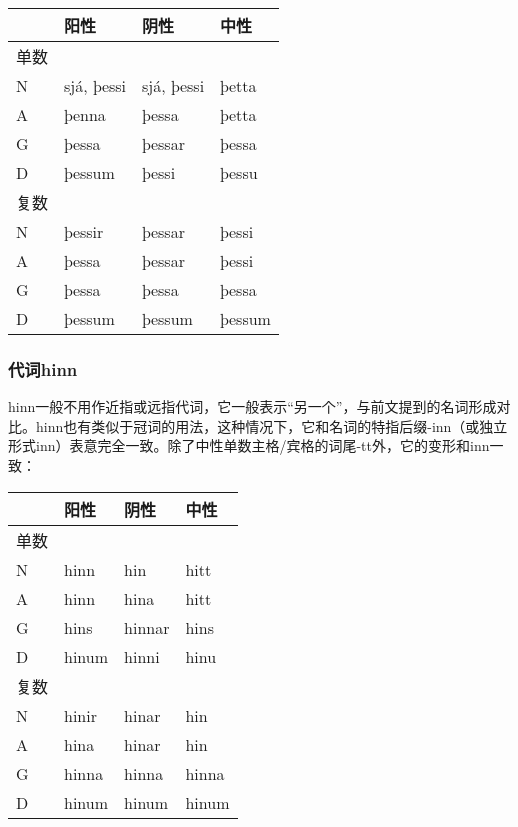 \begin{longtable}{llll}
    \toprule
         & 阳性       & 阴性       & 中性   \\
    \midrule
    \endhead
    \bottomrule
    \endfoot
    单数 &            &            &        \\
    N    & sjá, þessi & sjá, þessi & þetta  \\
    A    & þenna      & þessa      & þetta  \\
    G    & þessa      & þessar     & þessa  \\
    D    & þessum     & þessi      & þessu  \\
    复数 &            &            &        \\
    N    & þessir     & þessar     & þessi  \\
    A    & þessa      & þessar     & þessi  \\
    G    & þessa      & þessa      & þessa  \\
    D    & þessum     & þessum     & þessum \\
\end{longtable}

\subsubsection{代词hinn}

hinn一般不用作近指或远指代词，它一般表示``另一个''，与前文提到的名词形成对比。hinn也有类似于冠词的用法，这种情况下，它和名词的特指后缀-inn（或独立形式inn）表意完全一致。除了中性单数主格/宾格的词尾-tt外，它的变形和inn一致：

\begin{longtable}{llll}
    \toprule
         & 阳性  & 阴性   & 中性  \\
    \midrule
    \endhead
    \bottomrule
    \endfoot
    单数 &       &        &       \\
    N    & hinn  & hin    & hitt  \\
    A    & hinn  & hina   & hitt  \\
    G    & hins  & hinnar & hins  \\
    D    & hinum & hinni  & hinu  \\
    复数 &       &        &       \\
    N    & hinir & hinar  & hin   \\
    A    & hina  & hinar  & hin   \\
    G    & hinna & hinna  & hinna \\
    D    & hinum & hinum  & hinum \\
\end{longtable}


